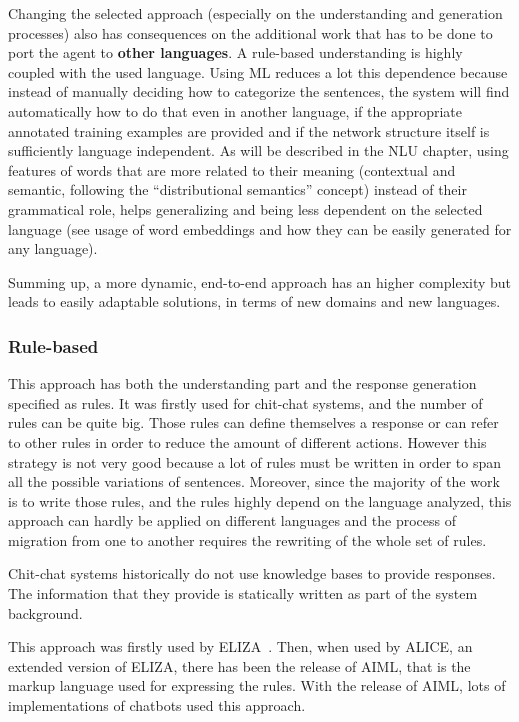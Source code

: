 Changing the selected approach (especially on the understanding and generation processes) also has consequences on the additional work that has to be done to port the agent to \textbf{other languages}. A rule-based understanding is highly coupled with the used language. Using ML reduces a lot this dependence because instead of manually deciding how to categorize the sentences, the system will find automatically how to do that even in another language, if the appropriate annotated training examples are provided and if the network structure itself is sufficiently language independent. As will be described in the NLU chapter, using features of words that are more related to their meaning (contextual and semantic, following the ``distributional semantics''  concept) instead of their grammatical role, helps generalizing and being less dependent on the selected language (see usage of word embeddings and how they can be easily generated for any language).

Summing up, a more dynamic, end-to-end approach has an higher complexity but leads to easily adaptable solutions, in terms of new domains and new languages.

\subsubsection{Rule-based}
\label{soaRuleApproach}

This approach has both the understanding part and the response generation specified as rules. It was firstly used for chit-chat systems, and the number of rules can be quite big. Those rules can define themselves a response or can refer to other rules in order to reduce the amount of different actions. However this strategy is not very good because a lot of rules must be written in order to span all the possible variations of sentences. Moreover, since the majority of the work is to write those rules, and the rules highly depend on the language analyzed, this approach can hardly be applied on different languages and the process of migration from one to another requires the rewriting of the whole set of rules.

Chit-chat systems historically do not use knowledge bases to provide responses. The information that they provide is statically written as part of the system background.

This approach was firstly used by ELIZA~\cite{weizenbaum1966eliza}. Then, when used by ALICE, an extended version of ELIZA, there has been the release of AIML, that is the markup language used for expressing the rules. With the release of AIML, lots of implementations of chatbots used this approach.

